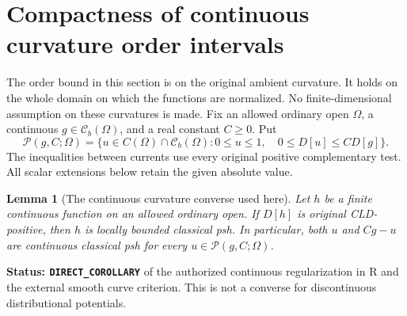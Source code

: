\documentclass[11pt,a4paper]{article}
\numberwithin{equation}{section}
\newtheorem{lemma}[theorem]{Lemma}
\theoremstyle{definition}
\theoremstyle{remark}
\begin{document}


\section{Compactness of continuous curvature order intervals}
\label{sec:r6-curvature-order-compactness}

The order bound in this section is on the original ambient curvature.
It holds on the whole domain on which the functions are normalized.
No finite-dimensional assumption on these curvatures is made.
Fix an allowed ordinary open $\Omega$, a continuous
$g\in\mathcal C_b(\Omega)$, and a real constant $C\geq0$. Put
\begin{equation}
 \mathscr P(g,C;\Omega)=
 \{u\in C(\Omega)\cap\mathcal C_b(\Omega):
       0\leq u\leq1,\quad 0\leq D[u]\leq C D[g]\}.
 \label{eq:r6-curvature-order-family}
\end{equation}
The inequalities between currents use every original positive
complementary test. All scalar extensions below retain the given
absolute value.

\begin{lemma}[The continuous curvature converse used here]
\label{lem:r6-continuous-positive-classical}
Let $h$ be a finite continuous function on an allowed ordinary open.
If $D[h]$ is original CLD-positive, then $h$ is locally bounded
classical psh. In particular, both $u$ and $Cg-u$ are continuous
classical psh for every $u\in\mathscr P(g,C;\Omega)$.
\end{lemma}

\noindent\textbf{Status: \texttt{DIRECT\_COROLLARY}} of the
authorized continuous regularization in R and the external smooth
curve criterion. This is not a converse for discontinuous
distributional potentials.
\end{document}

